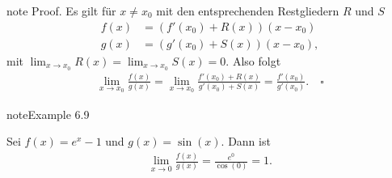 \documentclass[letterpaper,10pt,english]{jupyterBook}
\begin{document}
\begin{sphinxadmonition}{note}
Proof.  Es gilt für \(x \neq x_0\) mit den entsprechenden Restgliedern \(R\) und \(S\)
\begin{align*}
f(x) &= (f'(x_0) + R(x))(x-x_0) \\
g(x) &= (g'(x_0) + S(x))(x-x_0),
\end{align*}
mit \(\lim_{x \rightarrow x_0} R(x) = \lim_{x \rightarrow x_0} S(x) =0. \)
Also folgt
\begin{equation*}
\begin{split}\lim_{x \rightarrow x_0} \frac{f(x)}{g(x)} = \lim_{x \rightarrow x_0} \frac{f'(x_0) + R(x)}{g'(x_0) + S(x)} = \frac{f'(x_0)}{g'(x_0)}.  \quad\square\end{split}
\end{equation*}\end{sphinxadmonition}
\label{differential/mws:example-3}
\begin{sphinxadmonition}{note}{Example 6.9}



Sei \(f(x) = e^x-1\) und \(g(x) = \sin(x)\). Dann ist
\begin{equation*}
\begin{split} \lim_{x \rightarrow 0} \frac{f(x)}{g(x)} = \frac{e^0}{\cos(0)} = 1.\end{split}
\end{equation*}\end{sphinxadmonition}
\end{document}
